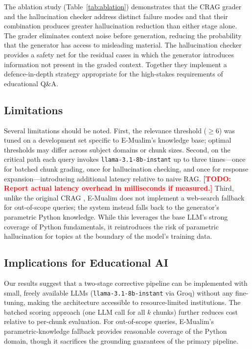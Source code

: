 \documentclass[conference]{IEEEtran}
\newcommand{\todo}[1]{\textcolor{red}{\textbf{[TODO: #1]}}}
\begin{document}
The ablation study (Table~\ref{tab:ablation}) demonstrates that
the CRAG grader and the hallucination checker address distinct
failure modes and that their combination produces greater
hallucination reduction than either stage alone.
The grader eliminates context noise before generation, reducing the
probability that the generator has access to misleading material.
The hallucination checker provides a safety net for the residual
cases in which the generator introduces information not present in
the graded context.
Together they implement a defence-in-depth strategy appropriate for
the high-stakes requirements of educational Q\&A.

\subsection{Limitations}

Several limitations should be noted.
First, the relevance threshold ($\geq 6$) was tuned on a development
set specific to E-Mualim's knowledge base; optimal thresholds may
differ across subject domains or chunk sizes.
Second, on the critical path each query invokes
\texttt{llama-3.1-8b-instant} up to three times---once for batched
chunk grading, once for hallucination checking, and once for
response expansion---introducing additional latency relative to
naive RAG.
\todo{Report actual latency overhead in milliseconds if measured.}
Third, unlike the original CRAG \cite{yan2024crag}, E-Mualim does not
implement a web-search fallback for out-of-scope queries; the system
instead falls back to the generator's parametric Python knowledge.
While this leverages the base LLM's strong coverage of Python
fundamentals, it reintroduces the risk of parametric hallucination
for topics at the boundary of the model's training data.

\subsection{Implications for Educational AI}

Our results suggest that a two-stage corrective pipeline can be
implemented with small, freely available LLMs
(\texttt{llama-3.1-8b-instant} via Groq) without any fine-tuning,
making the architecture accessible to resource-limited institutions.
The batched scoring approach (one LLM call for all $k$ chunks)
further reduces cost relative to per-chunk evaluation.
For out-of-scope queries, E-Mualim's parametric-knowledge fallback
provides reasonable coverage of the Python domain, though it
sacrifices the grounding guarantees of the primary pipeline.
\end{document}
